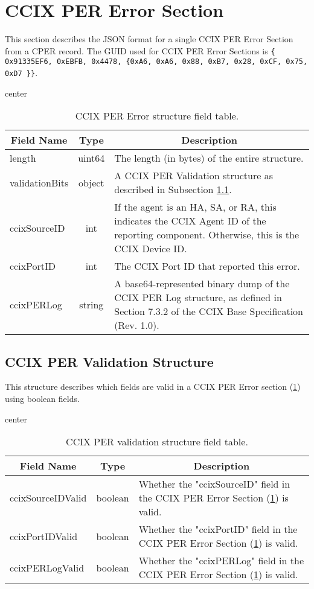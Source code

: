 \documentclass{report}
\newcommand*{\thead}[1]{\multicolumn{1}{|c|}{\bfseries #1}}
\newcommand*{\jsontable}[1]{
    \begin{table}[!ht]
    \label{#1}
    \centering
    \begin{adjustbox}{center}
    \begin{tabular}{|l|c|p{8cm}|}
    \hline
    \thead{Field Name} & \thead{Type} & \thead{Description} \\
    \hline
}
\newcommand*{\jsontableend}[1]{
    \hline
    \end{tabular}
    \end{adjustbox}
    \caption{#1}
    \label{table:#1}
    \end{table}
    \FloatBarrier
}
\begin{document}
\section{CCIX PER Error Section}
\label{section:ccixpererrorsection}
This section describes the JSON format for a single CCIX PER Error Section from a CPER record. The GUID used for CCIX PER Error Sections is \texttt{\{ 0x91335EF6, 0xEBFB, 0x4478, \{0xA6, 0xA6, 0x88, 0xB7, 0x28, 0xCF, 0x75, 0xD7 \}\}}.
\jsontable{table:ccixpererrorsection}
length & uint64 & The length (in bytes) of the entire structure.\\
\hline
validationBits & object & A CCIX PER Validation structure as described in Subsection \ref{subsection:ccixpervalidationstructure}.\\
\hline
ccixSourceID & int & If the agent is an HA, SA, or RA, this indicates the CCIX Agent ID of the reporting component. Otherwise, this is the CCIX Device ID.\\
\hline
ccixPortID & int & The CCIX Port ID that reported this error.\\
\hline
ccixPERLog & string & A base64-represented binary dump of the CCIX PER Log structure, as defined in Section 7.3.2 of the CCIX Base Specification (Rev. 1.0).\\
\jsontableend{CCIX PER Error structure field table.}

\subsection{CCIX PER Validation Structure}
\label{subsection:ccixpervalidationstructure}
This structure describes which fields are valid in a CCIX PER Error section (\ref{section:ccixpererrorsection}) using boolean fields.
\jsontable{table:ccixpervalidationstructure}
ccixSourceIDValid & boolean & Whether the "ccixSourceID" field in the CCIX PER Error Section (\ref{section:ccixpererrorsection}) is valid.\\
\hline
ccixPortIDValid & boolean & Whether the "ccixPortID" field in the CCIX PER Error Section (\ref{section:ccixpererrorsection}) is valid.\\
\hline
ccixPERLogValid & boolean & Whether the "ccixPERLog" field in the CCIX PER Error Section (\ref{section:ccixpererrorsection}) is valid.\\
\jsontableend{CCIX PER validation structure field table.}

\end{document}
